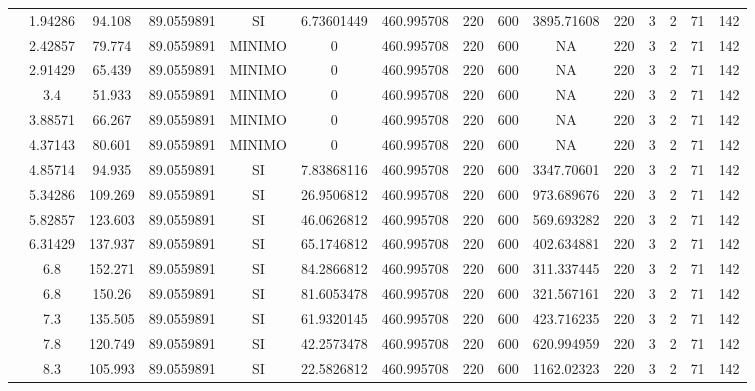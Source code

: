 \begin{table}[H]
{\begin{tabular}{|c|c|c|c|c|c|c|c|c|c|c|c|c|c|c|}
\cline{2-15}    & 1.94286 & 94.108 & 89.0559891 & SI  & 6.73601449 & 460.995708 & 220 & 600 & 3895.71608 & 220 & 3   & 2   & 71  & 142 \bigstrut\\
\cline{2-15}    & 2.42857 & 79.774 & 89.0559891 & MINIMO & 0   & 460.995708 & 220 & 600 & NA  & 220 & 3   & 2   & 71  & 142 \bigstrut\\
\cline{2-15}    & 2.91429 & 65.439 & 89.0559891 & MINIMO & 0   & 460.995708 & 220 & 600 & NA  & 220 & 3   & 2   & 71  & 142 \bigstrut\\
\cline{2-15}    & 3.4 & 51.933 & 89.0559891 & MINIMO & 0   & 460.995708 & 220 & 600 & NA  & 220 & 3   & 2   & 71  & 142 \bigstrut\\
\cline{2-15}    & 3.88571 & 66.267 & 89.0559891 & MINIMO & 0   & 460.995708 & 220 & 600 & NA  & 220 & 3   & 2   & 71  & 142 \bigstrut\\
\cline{2-15}    & 4.37143 & 80.601 & 89.0559891 & MINIMO & 0   & 460.995708 & 220 & 600 & NA  & 220 & 3   & 2   & 71  & 142 \bigstrut\\
\cline{2-15}    & 4.85714 & 94.935 & 89.0559891 & SI  & 7.83868116 & 460.995708 & 220 & 600 & 3347.70601 & 220 & 3   & 2   & 71  & 142 \bigstrut\\
\cline{2-15}    & 5.34286 & 109.269 & 89.0559891 & SI  & 26.9506812 & 460.995708 & 220 & 600 & 973.689676 & 220 & 3   & 2   & 71  & 142 \bigstrut\\
\cline{2-15}    & 5.82857 & 123.603 & 89.0559891 & SI  & 46.0626812 & 460.995708 & 220 & 600 & 569.693282 & 220 & 3   & 2   & 71  & 142 \bigstrut\\
\cline{2-15}    & 6.31429 & 137.937 & 89.0559891 & SI  & 65.1746812 & 460.995708 & 220 & 600 & 402.634881 & 220 & 3   & 2   & 71  & 142 \bigstrut\\
\cline{2-15}    & 6.8 & 152.271 & 89.0559891 & SI  & 84.2866812 & 460.995708 & 220 & 600 & 311.337445 & 220 & 3   & 2   & 71  & 142 \bigstrut\\
\cline{2-15}    & 6.8 & 150.26 & 89.0559891 & SI  & 81.6053478 & 460.995708 & 220 & 600 & 321.567161 & 220 & 3   & 2   & 71  & 142 \bigstrut\\
\cline{2-15}    & 7.3 & 135.505 & 89.0559891 & SI  & 61.9320145 & 460.995708 & 220 & 600 & 423.716235 & 220 & 3   & 2   & 71  & 142 \bigstrut\\
\cline{2-15}    & 7.8 & 120.749 & 89.0559891 & SI  & 42.2573478 & 460.995708 & 220 & 600 & 620.994959 & 220 & 3   & 2   & 71  & 142 \bigstrut\\
\cline{2-15}    & 8.3 & 105.993 & 89.0559891 & SI  & 22.5826812 & 460.995708 & 220 & 600 & 1162.02323 & 220 & 3   & 2   & 71  & 142 \bigstrut\\

\end{tabular}}
\end{table}
